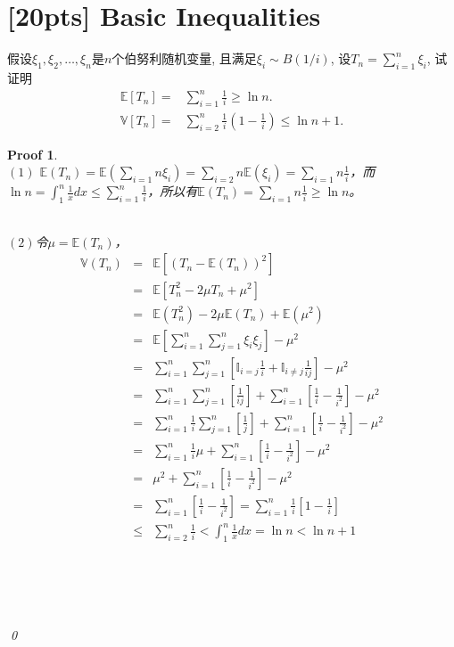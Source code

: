 \documentclass[a4paper,UTF8]{article}
\numberwithin{equation}{section}
\newtheorem*{myProof}{Proof}
\begin{document}
\newpage
\section{[20pts] Basic Inequalities}
	\noindent
	假设$\xi_1,\xi_2,\ldots,\xi_n$是$n$个伯努利随机变量, 且满足$\xi_i\sim B(1/i)$, 设$T_n=\sum_{i=1}^n \xi_i$, 试证明
	\begin{align*}
		\mathbb{E}[T_n] =& \sum_{i=1}^n\frac{1}{i}\geq \ln n. \\
		\mathbb{V}[T_n] =& \sum_{i=2}^n \frac{1}{i}\left(1-\frac{1}{i}\right)\leq \ln n+1.
	\end{align*}
	
	
\begin{myProof}
~\\
$(1)$ $\mathbb{E}(T_n) = \mathbb{E} (\sum_{i=1}{n} \xi_i) = \sum_{i=2}{n} \mathbb{E} (\xi_i) = \sum_{i=1}{n} \frac{1}{i}$，而$\ln n = \int_1^n \frac{1}{x} dx \le \sum_{i=1}^n \frac{1}{i} $，所以有$ \mathbb{E}(T_n) = \sum_{i=1}{n} \frac{1}{i} \ge \ln n$。

~\\
$(2)$令$\mu = \mathbb{E}(T_n)$，
\begin{eqnarray*}
\mathbb{V}(T_n) &=& \mathbb{E}[(T_n - \mathbb{E}(T_n))^2] \\
&=& \mathbb{E}[ T_n^2 - 2\mu T_n + \mu^2 ] \\
&=& \mathbb{E}(T_n^2) - 2\mu\mathbb{E}(T_n) + \mathbb{E}(\mu^2) \\
&=& \mathbb{E}[ \sum_{i=1}^{n} \sum_{j=1}^{n} \xi_i \xi_j ] - \mu^2 \\
&=& \sum_{i=1}^{n} \sum_{j=1}^{n} [ \mathbb{I}_{i=j} \frac{1}{i} + \mathbb{I}_{i\ne j} \frac{1}{ij} ] - \mu^2 \\
&=& \sum_{i=1}^{n} \sum_{j=1}^{n} [ \frac{1}{ij} ] + \sum_{i=1}^{n} [ \frac{1}{i} - \frac{1}{i^2} ] - \mu^2 \\
&=& \sum_{i=1}^{n} \frac{1}{i} \sum_{j=1}^{n} [ \frac{1}{j} ] + \sum_{i=1}^{n} [ \frac{1}{i} - \frac{1}{i^2} ] - \mu^2 \\
&=& \sum_{i=1}^{n} \frac{1}{i}\mu + \sum_{i=1}^{n} [ \frac{1}{i} - \frac{1}{i^2} ] - \mu^2 \\
&=& \mu^2 + \sum_{i=1}^{n} [ \frac{1}{i} - \frac{1}{i^2} ] - \mu^2 \\
&=& \sum_{i=1}^{n} [ \frac{1}{i} - \frac{1}{i^2} ] = \sum_{i=1}^{n} \frac{1}{i} [ 1 - \frac{1}{i} ] \\
&\le& \sum_{i=2}^n \frac{1}{i} < \int_1^n \frac{1}{x} dx = \ln n < \ln n + 1
\end{eqnarray*}
	
	~\\
	~\\
	~\\
	~\\
	\qed
\end{myProof}
\end{document}
